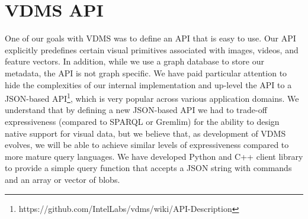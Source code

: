 \section{VDMS API}
\label{arch}
One of our goals with VDMS was to define an API that is easy to use.
Our API explicitly predefines certain
visual primitives associated with images, videos, and feature vectors. In
addition, while we use a graph database to store our metadata, the API is not
graph specific.
We have paid particular attention to hide the complexities of our internal
implementation and up-level the API to a JSON-based
API\footnote{https://github.com/IntelLabs/vdms/wiki/API-Description},
which is very popular across various application domains.
We understand that by defining a new JSON-based API we had to trade-off
expressiveness (compared to SPARQL or Gremlim) for the ability to design
native support for visual data, but we believe that, as development of VDMS
evolves, we will be able to achieve similar levels of expressiveness compared
to more mature query languages.
We have developed Python and C++ client
library to provide a simple query function that accepts a JSON string with
commands and an array or vector of blobs.

